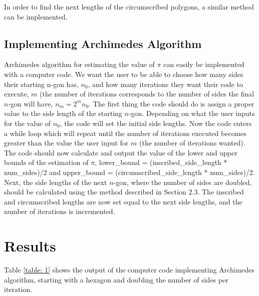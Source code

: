 \documentclass{article}
\begin{document}
In order to find the next lengths of the circumscribed polygons, a similar method can be implemented. 


\subsection{Implementing Archimedes Algorithm}
Archimedes algorithm for estimating the value of $\pi$ can easily be implemented with a computer code. We want the user to be able to choose how many sides their starting n-gon has, $n_0$, and how many iterations they want their code to execute, $m$ (the number of iterations corresponds to the number of sides the final $n$-gon will have, $n_m = 2^m n_0$. The first thing the code should do is assign a proper value to the side length of the starting $n$-gon. Depending on what the user inputs for the value of $n_0$, the code will set the initial side lengths. Now the code enters a while loop which will repeat until the number of iterations executed becomes greater than the value the user input for $m$ (the number of iterations wanted). The code should now calculate and output the value of the lower and upper bounds of the estimation of $\pi$, lower\_bound = (inscribed\_side\_length * num\_sides)/2 and upper\_bound = (circumscribed\_side\_length * num\_sides)/2. Next, the side lengths of the next $n$-gon, where the number of sides are doubled, should be calculated using the method described in Section 2.3. The inscribed and circumscribed lengths are now set equal to the next side lengths, and the number of iterations is incremented.


\section{Results}

Table \ref{table: 1} shows the output of the computer code implementing Archimedes algorithm, starting with a hexagon and doubling the number of sides per iteration.
\end{document}
